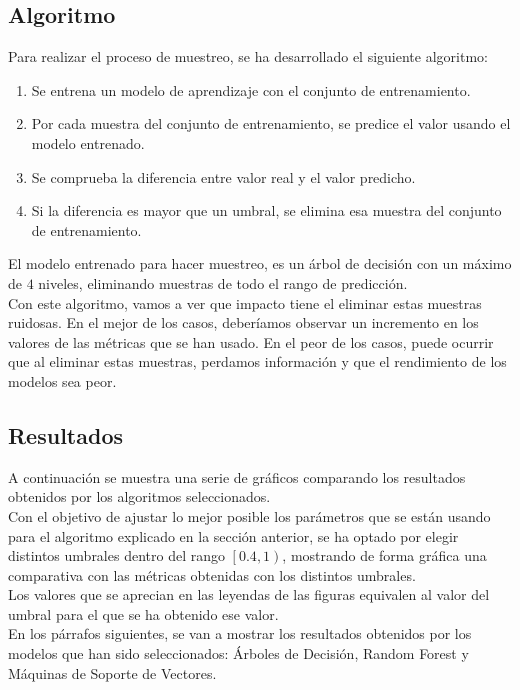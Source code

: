 \subsection{Algoritmo}
Para realizar el proceso de muestreo, se ha desarrollado el siguiente algoritmo:
\begin{enumerate}
	\item Se entrena un modelo de aprendizaje con el conjunto de entrenamiento.
	\item Por cada muestra del conjunto de entrenamiento, se predice el valor usando el modelo entrenado.
	\item Se comprueba la diferencia entre valor real y el valor predicho.
	\item Si la diferencia es mayor que un umbral, se elimina esa muestra del conjunto de entrenamiento.
\end{enumerate}
El modelo entrenado para hacer muestreo, es un árbol de decisión con un máximo de $4$ niveles, eliminando muestras de todo el rango de predicción.\\
\linebreak
Con este algoritmo, vamos a ver que impacto tiene el eliminar estas muestras ruidosas. En el mejor de los casos, deberíamos observar un incremento en los valores de las métricas que se han usado. En el peor de los casos, puede ocurrir que al eliminar estas muestras, perdamos información y que el rendimiento de los modelos sea peor. 
\clearpage
\subsection{Resultados}
A continuación se muestra una serie de gráficos comparando los resultados obtenidos por los algoritmos seleccionados.\\
\linebreak
Con el objetivo de ajustar lo mejor posible los parámetros que se están usando para el algoritmo explicado en la sección anterior, se ha optado por elegir distintos umbrales dentro del rango $\left[0.4,1\right)$, mostrando de forma gráfica una comparativa con las métricas obtenidas con los distintos umbrales.\\
Los valores que se aprecian en las leyendas de las figuras equivalen al valor del umbral para el que se ha obtenido ese valor.\\
\linebreak
En los párrafos siguientes, se van a mostrar los resultados obtenidos por los modelos que han sido seleccionados: Árboles de Decisión, Random Forest y Máquinas de Soporte de Vectores.
